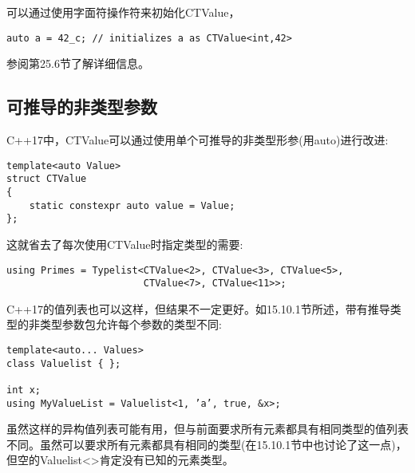 可以通过使用字面符操作符来初始化CTValue，

\begin{lstlisting}[style=styleCXX]
auto a = 42_c; // initializes a as CTValue<int,42>
\end{lstlisting}

参阅第25.6节了解详细信息。

\subsection{可推导的非类型参数}

C++17中，CTValue可以通过使用单个可推导的非类型形参(用auto)进行改进:

\begin{lstlisting}[style=styleCXX]
template<auto Value>
struct CTValue
{
	static constexpr auto value = Value;
};
\end{lstlisting}

这就省去了每次使用CTValue时指定类型的需要:

\begin{lstlisting}[style=styleCXX]
using Primes = Typelist<CTValue<2>, CTValue<3>, CTValue<5>,
						CTValue<7>, CTValue<11>>;
\end{lstlisting}

C++17的值列表也可以这样，但结果不一定更好。如15.10.1节所述，带有推导类型的非类型参数包允许每个参数的类型不同:

\begin{lstlisting}[style=styleCXX]
template<auto... Values>
class Valuelist { };

int x;
using MyValueList = Valuelist<1, ’a’, true, &x>;
\end{lstlisting}

虽然这样的异构值列表可能有用，但与前面要求所有元素都具有相同类型的值列表不同。虽然可以要求所有元素都具有相同的类型(在15.10.1节中也讨论了这一点)，但空的Valuelist<>肯定没有已知的元素类型。













